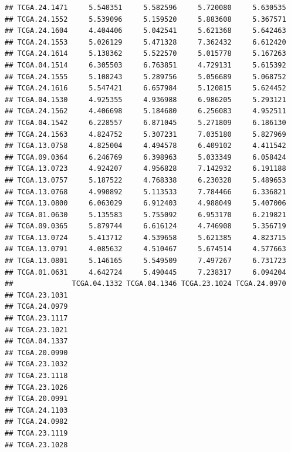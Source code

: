 \documentclass[UTF8]{beamer}\usepackage[]{graphicx}\usepackage[]{color}
\makeatletter
\newenvironment{kframe}{%
 \def\at@end@of@kframe{}%
 \ifinner\ifhmode%
  \def\at@end@of@kframe{\end{minipage}}%
  \begin{minipage}{\columnwidth}%
 \fi\fi%
 \def\FrameCommand##1{\hskip\@totalleftmargin \hskip-\fboxsep
 \colorbox{shadecolor}{##1}\hskip-\fboxsep
     \hskip-\linewidth \hskip-\@totalleftmargin \hskip\columnwidth}%
 \MakeFramed {\advance\hsize-\width
   \@totalleftmargin\z@ \linewidth\hsize
   \@setminipage}}%
 {\par\unskip\endMakeFramed%
 \at@end@of@kframe}
\newenvironment{knitrout}{}{} %
\makeatother
\begin{document}
\begin{frame}[fragile]
\begin{knitrout}
\begin{kframe}
\begin{verbatim}
## TCGA.24.1471     5.540351     5.582596     5.720080     5.630535
## TCGA.24.1552     5.539096     5.159520     5.883608     5.367571
## TCGA.24.1604     4.404406     5.042541     5.621368     5.642463
## TCGA.24.1553     5.026129     5.471328     7.362432     6.612420
## TCGA.24.1614     5.138362     5.522570     5.015778     5.167263
## TCGA.04.1514     6.305503     6.763851     4.729131     5.615392
## TCGA.24.1555     5.108243     5.289756     5.056689     5.068752
## TCGA.24.1616     5.547421     6.657984     5.120815     5.624452
## TCGA.04.1530     4.925355     4.936988     6.986205     5.293121
## TCGA.24.1562     4.406698     5.184680     6.256083     4.952511
## TCGA.04.1542     6.228557     6.871045     5.271809     6.186130
## TCGA.24.1563     4.824752     5.307231     7.035180     5.827969
## TCGA.13.0758     4.825004     4.494578     6.409102     4.411542
## TCGA.09.0364     6.246769     6.398963     5.033349     6.058424
## TCGA.13.0723     4.924207     4.956828     7.142932     6.191188
## TCGA.13.0757     5.187522     4.768338     6.230328     5.489653
## TCGA.13.0768     4.990892     5.113533     7.784466     6.336821
## TCGA.13.0800     6.063029     6.912403     4.988049     5.407006
## TCGA.01.0630     5.135583     5.755092     6.953170     6.219821
## TCGA.09.0365     5.879744     6.616124     4.746908     5.356719
## TCGA.13.0724     5.413712     4.539658     5.621385     4.823715
## TCGA.13.0791     4.085632     4.510467     5.674514     4.577663
## TCGA.13.0801     5.146165     5.549509     7.497267     6.731723
## TCGA.01.0631     4.642724     5.490445     7.238317     6.094204
##              TCGA.04.1332 TCGA.04.1346 TCGA.23.1024 TCGA.24.0970
## TCGA.23.1031                                                    
## TCGA.24.0979                                                    
## TCGA.23.1117                                                    
## TCGA.23.1021                                                    
## TCGA.04.1337                                                    
## TCGA.20.0990                                                    
## TCGA.23.1032                                                    
## TCGA.23.1118                                                    
## TCGA.23.1026                                                    
## TCGA.20.0991                                                    
## TCGA.24.1103                                                    
## TCGA.24.0982                                                    
## TCGA.23.1119                                                    
## TCGA.23.1028                                                    

\end{verbatim}
\end{kframe}
\end{knitrout}
\end{frame}
\end{document}
